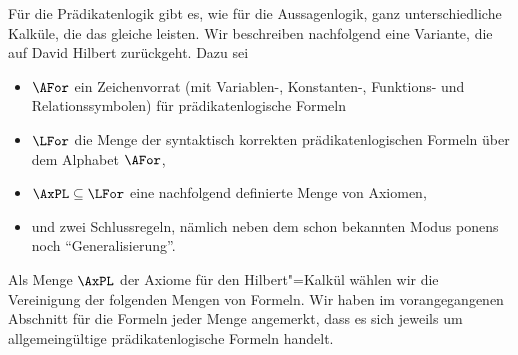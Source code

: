 Für die Prädikatenlogik gibt es, wie für die Aussagenlogik, ganz
unterschiedliche Kalküle, die das gleiche leisten.
%
Wir beschreiben nachfolgend eine Variante, die auf David Hilbert
zurückgeht.
%
Dazu sei
\begin{itemize}
\item $\AFor$ ein Zeichenvorrat (mit Variablen-, Konstanten-,
  Funktions- und Relationssymbolen) für prädikatenlogische Formeln
\item $\LFor$ die Menge der syntaktisch korrekten prädikatenlogischen
  Formeln über dem Alphabet $\AFor$,
\item $\AxPL\subseteq\LFor$ eine nachfolgend definierte Menge von
  Axiomen,
\item und zwei Schlussregeln, nämlich neben dem schon bekannten Modus
  ponens noch "`Generalisierung"'.
\end{itemize}
%
Als Menge $\AxPL$ der Axiome für den Hilbert"=Kalkül wählen wir die
Vereinigung der folgenden Mengen von Formeln.
%
Wir haben im vorangegangenen Abschnitt für die Formeln jeder Menge
angemerkt, dass es sich jeweils um allgemeingültige prädikatenlogische
Formeln handelt.
%
